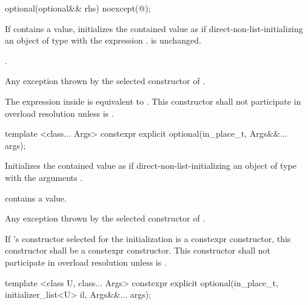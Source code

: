 %
\begin{itemdecl}
optional(optional&& rhs) noexcept(@\seebelow@);
\end{itemdecl}

\begin{itemdescr}
\pnum
\effects
If  contains a value, initializes the contained value as if
direct-non-list-initializing an object of type  with the expression .
 is unchanged.

\pnum
\postconditions
{}.

\pnum
\throws
Any exception thrown by the selected constructor of .

\pnum
\remarks
The expression inside  is equivalent to
.
This constructor shall not participate in overload resolution
unless  is .
\end{itemdescr}

%
\begin{itemdecl}
template <class... Args> constexpr explicit optional(in_place_t, Args&&... args);
\end{itemdecl}

\begin{itemdescr}
\pnum
\effects
Initializes the contained value as if direct-non-list-initializing an object of type  with the arguments .

\pnum
\postconditions
{} contains a value.

\pnum
\throws
Any exception thrown by the selected constructor of .

\pnum
\remarks
If 's constructor selected for the initialization is a constexpr constructor, this constructor shall be a constexpr constructor.
This constructor shall not participate in overload resolution
unless  is .
\end{itemdescr}

%
\begin{itemdecl}
template <class U, class... Args>
  constexpr explicit optional(in_place_t, initializer_list<U> il, Args&&... args);
\end{itemdecl}

